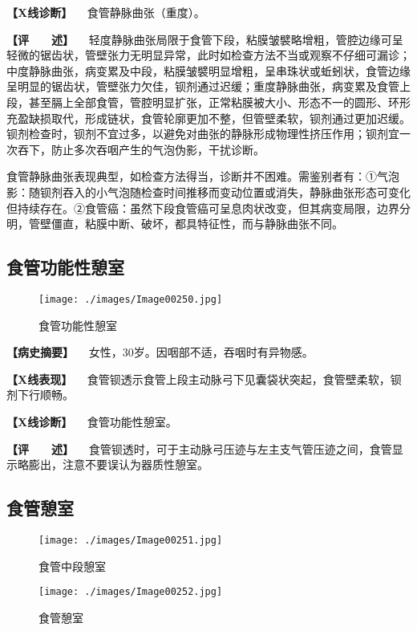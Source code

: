 \textbf{【X线诊断】} 　食管静脉曲张（重度）。

\textbf{【评　　述】}
　轻度静脉曲张局限于食管下段，粘膜皱襞略增粗，管腔边缘可呈轻微的锯齿状，管壁张力无明显异常，此时如检查方法不当或观察不仔细可漏诊；中度静脉曲张，病变累及中段，粘膜皱襞明显增粗，呈串珠状或蚯蚓状，食管边缘呈明显的锯齿状，管壁张力欠佳，钡剂通过迟缓；重度静脉曲张，病变累及食管上段，甚至膈上全部食管，管腔明显扩张，正常粘膜被大小、形态不一的圆形、环形充盈缺损取代，形成链状，食管轮廓更加不整，但管壁柔软，钡剂通过更加迟缓。钡剂检查时，钡剂不宜过多，以避免对曲张的静脉形成物理性挤压作用；钡剂宜一次吞下，防止多次吞咽产生的气泡伪影，干扰诊断。

食管静脉曲张表现典型，如检查方法得当，诊断并不困难。需鉴别者有：①气泡影：随钡剂吞入的小气泡随检查时间推移而变动位置或消失，静脉曲张形态可变化但持续存在。②食管癌：虽然下段食管癌可呈息肉状改变，但其病变局限，边界分明，管壁僵直，粘膜中断、破坏，都具特征性，而与静脉曲张不同。

\subsection{食管功能性憩室}

\begin{figure}[!htbp]
 \centering
 \texttt{[image: ./images/Image00250.jpg]}
 \captionsetup{justification=centering}
 \caption{食管功能性憩室}
 \label{fig5-2-7}
  \end{figure} 

\textbf{【病史摘要】} 　女性，30岁。因咽部不适，吞咽时有异物感。

\textbf{【X线表现】}
　食管钡透示食管上段主动脉弓下见囊袋状突起，食管壁柔软，钡剂下行顺畅。

\textbf{【X线诊断】} 　食管功能性憩室。

\textbf{【评　　述】}
　食管钡透时，可于主动脉弓压迹与左主支气管压迹之间，食管显示略膨出，注意不要误认为器质性憩室。

\subsection{食管憩室}

\begin{figure}[!htbp]
 \centering
 \texttt{[image: ./images/Image00251.jpg]}
 \captionsetup{justification=centering}
 \caption{食管中段憩室}
 \label{fig5-2-8}
  \end{figure} 

\begin{figure}[!htbp]
 \centering
 \texttt{[image: ./images/Image00252.jpg]}
 \captionsetup{justification=centering}
 \caption{食管憩室}
 \label{fig5-2-9}
  \end{figure} 

